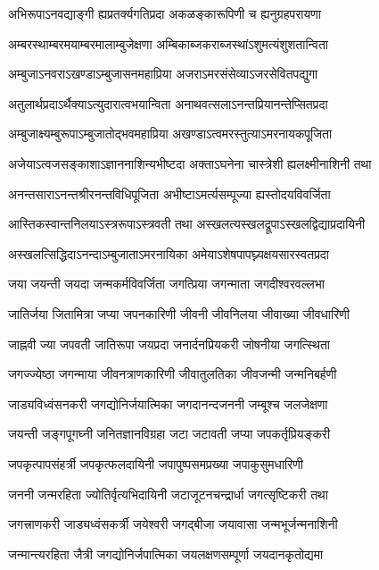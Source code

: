 \twolineshloka
{अभिरूपाऽनवद्याङ्गी ह्यप्रतर्क्यगतिप्रदा}
{अकळङ्कारूपिणी च ह्यनुग्रहपरायणा}%

\twolineshloka
{अम्बरस्थाम्बरमयाम्बरमालाम्बुजेक्षणा}
{अम्बिकाब्जकराब्जस्थांऽशुमत्यंशुशतान्विता}%

\twolineshloka
{अम्बुजाऽनवराऽखण्डाऽम्बुजासनमहाप्रिया}
{अजराऽमरसंसेव्याऽजरसेवितपद्युगा}%

\twolineshloka
{अतुलार्थप्रदाऽर्थैक्याऽत्युदारात्वभयान्विता}
{अनाथवत्सलाऽनन्तप्रियानन्तेप्सितप्रदा}%

\twolineshloka
{अम्बुजाक्ष्यम्बुरूपाऽम्बुजातोद्भवमहाप्रिया}
{अखण्डाऽत्वमरस्तुत्याऽमरनायकपूजिता}%

\twolineshloka
{अजेयाऽत्वजसङ्काशाऽज्ञाननाशिन्यभीष्टदा}
{अक्ताऽघनेना चास्त्रेशी ह्यलक्ष्मीनाशिनी तथा}%

\twolineshloka
{अनन्तसाराऽनन्तश्रीरनन्तविधिपूजिता}
{अभीष्टाऽमर्त्यसम्पूज्या ह्यस्तोदयविवर्जिता}%

\twolineshloka
{आस्तिकस्वान्तनिलयाऽस्त्ररूपाऽस्त्रवती तथा}
{अस्खलत्यस्खलद्रूपाऽस्खलद्विद्याप्रदायिनी}%

\twolineshloka
{अस्खलत्सिद्धिदाऽनन्दाऽम्बुजाताऽमरनायिका}
{अमेयाऽशेषपापघ्न्यक्षयसारस्वतप्रदा}%

\twolineshloka
{जया जयन्ती जयदा जन्मकर्मविवर्जिता}
{जगत्प्रिया जगन्माता जगदीश्वरवल्लभा}%

\twolineshloka
{जातिर्जया जितामित्रा जप्या जपनकारिणी}
{जीवनी जीवनिलया जीवाख्या जीवधारिणी}%

\twolineshloka
{जाह्नवी ज्या जपवती जातिरूपा जयप्रदा}
{जनार्दनप्रियकरी जोषनीया जगत्स्थिता}%

\twolineshloka
{जगज्ज्येष्ठा जगन्माया जीवनत्राणकारिणी}
{जीवातुलतिका जीवजन्मी जन्मनिबर्हणी}%

\twolineshloka
{जाड्यविध्वंसनकरी जगद्योनिर्जयात्मिका}
{जगदानन्दजननी जम्बूश्च जलजेक्षणा}%

\twolineshloka
{जयन्ती जङ्गपूगघ्नी जनितज्ञानविग्रहा}
{जटा जटावती जप्या जपकर्तृप्रियङ्करी}%

\twolineshloka
{जपकृत्पापसंहर्त्री जपकृत्फलदायिनी}
{जपापुष्पसमप्रख्या जपाकुसुमधारिणी}%

\twolineshloka
{जननी जन्मरहिता ज्योतिर्वृत्यभिदायिनी}
{जटाजूटनचन्द्रार्धा जगत्सृष्टिकरी तथा}%

\twolineshloka
{जगत्त्राणकरी जाड्यध्वंसकर्त्री जयेश्वरी}
{जगद्बीजा जयावासा जन्मभूर्जन्मनाशिनी}%

\twolineshloka
{जन्मान्त्यरहिता जैत्री जगद्योनिर्जपात्मिका}
{जयलक्षणसम्पूर्णा जयदानकृतोद्यमा}%

